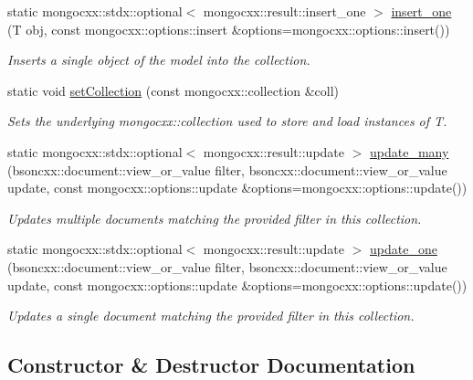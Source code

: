\begin{DoxyCompactItemize}
static mongocxx\+::stdx\+::optional$<$ mongocxx\+::result\+::insert\+\_\+one $>$ \hyperlink{classmangrove_1_1model_ad9695cdffd6a1abcd62d791caa6943e8}{insert\+\_\+one} (T obj, const mongocxx\+::options\+::insert \&options=mongocxx\+::options\+::insert())
\begin{DoxyCompactList}\small\item\em Inserts a single object of the model into the collection. \end{DoxyCompactList}\item 
static void \hyperlink{classmangrove_1_1model_aa292dacb7aa8fc25c9f0fa758e5419fd}{set\+Collection} (const mongocxx\+::collection \&coll)
\begin{DoxyCompactList}\small\item\em Sets the underlying mongocxx\+::collection used to store and load instances of T. \end{DoxyCompactList}\item 
static mongocxx\+::stdx\+::optional$<$ mongocxx\+::result\+::update $>$ \hyperlink{classmangrove_1_1model_ab811a568d41f8721b679d5e509bf9072}{update\+\_\+many} (bsoncxx\+::document\+::view\+\_\+or\+\_\+value filter, bsoncxx\+::document\+::view\+\_\+or\+\_\+value update, const mongocxx\+::options\+::update \&options=mongocxx\+::options\+::update())
\begin{DoxyCompactList}\small\item\em Updates multiple documents matching the provided filter in this collection. \end{DoxyCompactList}\item 
static mongocxx\+::stdx\+::optional$<$ mongocxx\+::result\+::update $>$ \hyperlink{classmangrove_1_1model_ab0d60c7d8c2285e90456547f40b9f873}{update\+\_\+one} (bsoncxx\+::document\+::view\+\_\+or\+\_\+value filter, bsoncxx\+::document\+::view\+\_\+or\+\_\+value update, const mongocxx\+::options\+::update \&options=mongocxx\+::options\+::update())
\begin{DoxyCompactList}\small\item\em Updates a single document matching the provided filter in this collection. \end{DoxyCompactList}\end{DoxyCompactItemize}


\subsection{Constructor \& Destructor Documentation}
